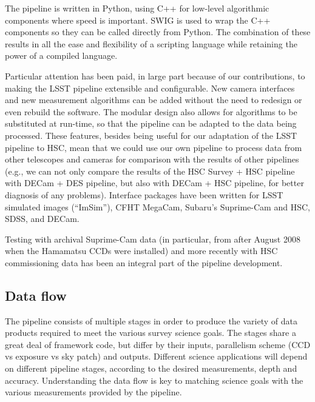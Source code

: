 \documentclass[12pt]{article}
\begin{document}
The pipeline is written in Python, using C++ for low-level algorithmic components where speed is important.
SWIG is used to wrap the C++ components so they can be called directly from Python.  The combination of these
results in all the ease and flexibility of a scripting language while retaining the power of a compiled
language.

Particular attention has been paid, in large part because of our contributions, to making the LSST pipeline
extensible and configurable.  New camera interfaces and new measurement algorithms can be added without the
need to redesign or even rebuild the software.  The modular design also allows for algorithms to be
substituted at run-time, so that the pipeline can be adapted to the data being processed.
These features, besides
being useful for our adaptation of the LSST pipeline to HSC, mean that we could use our own pipeline to
process data from other telescopes and cameras for comparison with the results of other pipelines (e.g., we
can not only compare the results of the HSC Survey + HSC pipeline with DECam + DES pipeline, but also with
DECam + HSC pipeline, for better diagnosis of any problems).  Interface packages have been written for LSST
simulated images (``ImSim''), CFHT MegaCam, Subaru's Suprime-Cam and HSC, SDSS, and DECam.

Testing with archival Suprime-Cam data (in particular, from after August 2008 when the Hamamatsu CCDs were
installed) and more recently with HSC commissioning data has been an integral part of the pipeline development.

\subsection{Data flow}

The pipeline consists of multiple stages in order to produce the variety of data products required to meet the
various survey science goals.  The stages share a great deal of framework code, but differ by their inputs,
parallelism scheme (CCD vs exposure vs sky patch) and outputs.  Different science applications will depend on
different pipeline stages, according to the desired measurements, depth and accuracy.  Understanding the data
flow is key to matching science goals with the various measurements provided by the pipeline.
\end{document}
